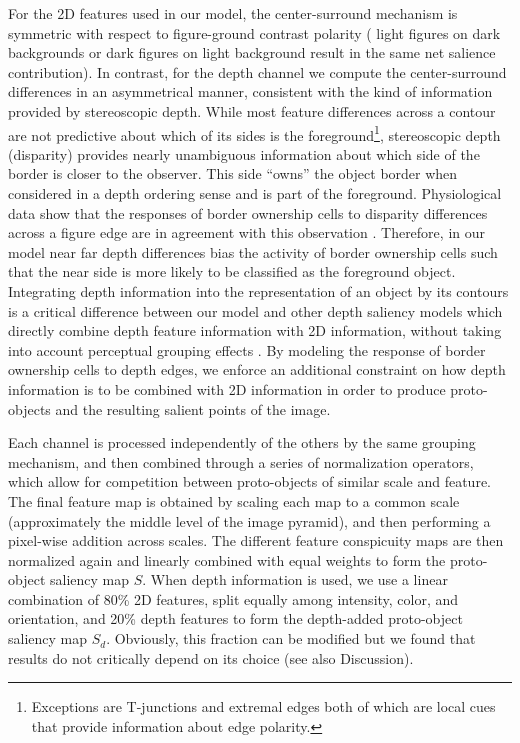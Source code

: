 For the 2D features used in our model, the center-surround mechanism
is symmetric with respect to figure-ground contrast polarity (\eg
light figures on dark backgrounds or dark figures on light background
result in the same net salience contribution). In contrast, for the
depth channel we compute the center-surround differences in an asymmetrical manner, consistent with the kind of information provided by stereoscopic depth.  While most feature differences across a contour are not predictive about which of its sides is the foreground\footnote{Exceptions are T-junctions \citep{Heitger_vonderHeydt93} and extremal edges \citep{Palmer_Ghose08,Ramenahalli_etal11a,Ramenahalli_etal12a,Ramenahalli_etal14a} both of which are local cues that provide information about edge polarity.\label{EEfootnote}}, stereoscopic depth (disparity)
provides nearly unambiguous information about which side of the border
is closer to the observer. This side ``owns'' the object border when
considered in a depth ordering sense and is part of the foreground. Physiological data show that the responses of border ownership cells to disparity differences across a figure edge are in agreement with this observation \citep{Zhou_etal00,Qiu_vonderHeydt05}. Therefore, in our model near \vs far depth differences bias the activity of border ownership cells such that the near side is more likely to be classified as the foreground object.  Integrating depth information into the representation of an object by its contours is a critical difference between our model and other depth saliency models which
directly combine depth feature information with 2D information, without taking into account perceptual grouping effects \cite[\eg][]{Ouerhani_etal00,Jost_etal04,Hugli_etal05}.  By modeling
the response of border ownership cells to depth edges, we enforce an
additional constraint on how depth information is to be combined with
2D information in order to produce proto-objects and the resulting salient points of the image.

Each channel is processed independently of the others by the same
grouping mechanism, and then combined through a series of normalization operators, which allow for competition between proto-objects of similar scale and feature. The final feature map is
obtained by scaling each map to a common scale (approximately the middle level of the image pyramid), and then performing a pixel-wise
addition across scales. The different feature conspicuity maps are then normalized again and linearly combined with equal weights to form
the proto-object saliency map $S$. When depth information is used, we
use a linear combination of 80\% 2D features, split equally among
intensity, color, and orientation, and 20\% depth features to form the
depth-added proto-object saliency map $S_d$.  Obviously, this fraction
can be modified but we found that results do not critically depend on
its choice (see also Discussion).


